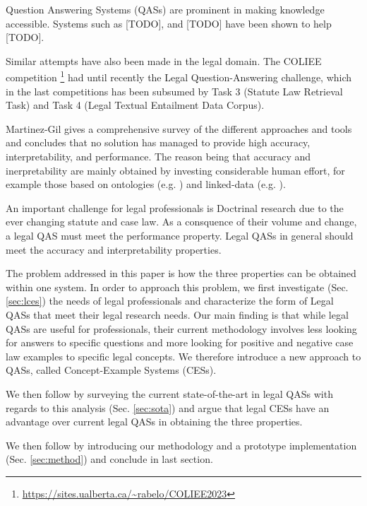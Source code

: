 Question Answering Systems (QASs) are prominent in making knowledge accessible. Systems such as [TODO], and [TODO] have been shown to help [TODO]. 


Similar attempts have also been made in the legal domain. The COLIEE competition \footnote{\url{https://sites.ualberta.ca/~rabelo/COLIEE2023}} had until recently the Legal Question-Answering challenge, which in the last competitions has been subsumed by Task 3 (Statute Law Retrieval Task) and Task 4 (Legal Textual Entailment Data Corpus). 

Martinez-Gil \cite{martinez23} gives a comprehensive survey of the different approaches and tools and concludes that no solution has managed to provide high accuracy, interpretability, and performance. The reason being that accuracy and inerpretability are mainly obtained by investing considerable human effort, for example those based on ontologies (e.g. \cite{wyner18}) and linked-data (e.g. \cite{filtz21}).

An important challenge for legal professionals is Doctrinal research \cite{kelly21} due to the ever changing statute and case law. As a consquence of their volume and change, a legal QAS must meet the performance property. Legal QASs in general should meet the accuracy and interpretability properties. 

The problem addressed in this paper is how the three properties can be obtained within one system. In order to approach this problem, we first investigate (Sec. \ref{sec:lces}) the needs of legal professionals and characterize the form of Legal QASs that meet their legal research needs. Our main finding is that while legal QASs are useful for professionals, their current methodology involves less looking for answers to specific questions and more looking for positive and negative case law examples to specific legal concepts. We therefore introduce a new approach to QASs, called Concept-Example Systems (CESs). 

We then follow by surveying the current state-of-the-art in legal QASs with regards to this analysis (Sec. \ref{sec:sota}) and argue that legal CESs have an advantage over current legal QASs in obtaining the three properties.

We then follow by introducing our methodology and a prototype implementation (Sec. \ref{sec:method}) and conclude in last section.